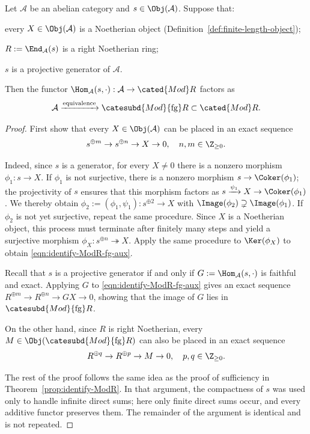 \begin{theorem}\label{prop:identify-ModR-fg}
	Let $\mathcal{A}$ be an abelian category and $s\in\Obj(\mathcal{A})$.
	Suppose that:
	\begin{compactitem}
		\item every $X\in\Obj(\mathcal{A})$ is a Noetherian object
		(Definition~\ref{def:finite-length-object});
		\item $R:=\End_{\mathcal{A}}(s)$ is a right Noetherian ring;
		\item $s$ is a projective generator of $\mathcal{A}$.
	\end{compactitem}
	Then the functor $\Hom_{\mathcal{A}}(s,\mathord\cdot):
	\mathcal{A}\to\cated{Mod}R$ factors as
	\[ \mathcal{A} \xrightarrow{\text{equivalence}} \catesubd{Mod}{\mathrm{fg}}R \subset \cated{Mod}R. \]
\end{theorem}
\begin{proof}
	First show that every $X\in\Obj(\mathcal{A})$ can be placed in an exact
	sequence
	\begin{equation}\label{eqn:identify-ModR-fg-aux}
		s^{\oplus m} \to s^{\oplus n} \to X \to 0, \quad n, m \in \Z_{\geq 0}.
	\end{equation}

	Indeed, since $s$ is a generator, for every $X\neq0$ there is a nonzero
	morphism $\phi_1:s\to X$. If $\phi_1$ is not surjective, there is a
	nonzero morphism $s\to\Coker(\phi_1)$; the projectivity of $s$ ensures
	that this morphism factors as
	$s\xrightarrow{\psi_1}X\to\Coker(\phi_1)$. We thereby obtain
	$\phi_2:=(\phi_1,\psi_1):s^{\oplus2}\to X$ with
	$\Image(\phi_2)\supsetneq\Image(\phi_1)$. If $\phi_2$ is not yet
	surjective, repeat the same procedure. Since $X$ is a Noetherian object,
	this process must terminate after finitely many steps and yield a
	surjective morphism $\phi_X:s^{\oplus n}\twoheadrightarrow X$. Apply the
	same procedure to $\Ker(\phi_X)$ to obtain
	\eqref{eqn:identify-ModR-fg-aux}.

	Recall that $s$ is a projective generator if and only if
	$G:=\Hom_{\mathcal{A}}(s,\mathord\cdot)$ is faithful and exact. Applying
	$G$ to \eqref{eqn:identify-ModR-fg-aux} gives an exact sequence
	$R^{\oplus m}\to R^{\oplus n}\to GX\to0$, showing that the image of $G$
	lies in $\catesubd{Mod}{\mathrm{fg}}R$.

	On the other hand, since $R$ is right Noetherian, every
	$M\in\Obj(\catesubd{Mod}{\mathrm{fg}}R)$ can also be placed in an exact
	sequence
	\[ R^{\oplus q} \to R^{\oplus p} \to M \to 0, \quad p, q \in \Z_{\geq 0}. \]

	The rest of the proof follows the same idea as the proof of sufficiency in
	Theorem~\ref{prop:identify-ModR}. In that argument, the compactness of $s$
	was used only to handle infinite direct sums; here only finite direct sums
	occur, and every additive functor preserves them. The remainder of the
	argument is identical and is not repeated.
\end{proof}
